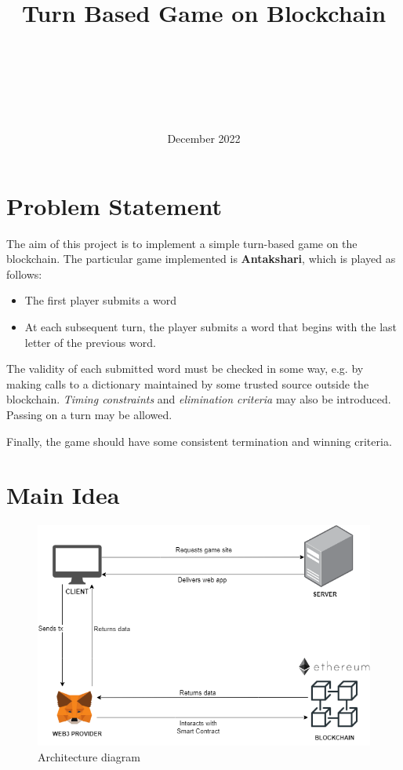 \documentclass{article}
\title{Turn Based Game on Blockchain}
\author{\au{Arora}{Harsh}{MCS202208} \\
        \au{Chakraborty}{Arghyadip}{MCS202206} \\
        \au{Gangamreddypalli}{Namratha}{MCS202105} \\
        \au{Gantait}{Arunava}{MCS202201} \\
        \au{Iyer}{Paarth}{MCS202218} \\}
\date{December 2022}
\begin{document}
\maketitle
\newpage
\tableofcontents
\newpage

\section{Problem Statement}
The aim of this project is to implement a simple turn-based game on the blockchain.
The particular game implemented is \textbf{Antakshari}, which is played   as follows:
\begin{itemize}
    \item The first player submits a word
    \item At each subsequent turn, the player submits a word that begins with the last letter of the previous word.
\end{itemize}
The validity of each submitted word must be checked in some way, e.g. by making calls
to a dictionary maintained by some trusted source outside the blockchain. \textit{Timing constraints} and \textit{elimination criteria} may also be introduced. Passing on a turn may be allowed.



Finally, the game should have some consistent termination and winning criteria.
\section{Main Idea}


\begin{figure}[htp]
    \centering
    \includegraphics[scale=0.5]{images/arch.png}
    \caption{Architecture diagram}
\end{figure}
\end{document}
